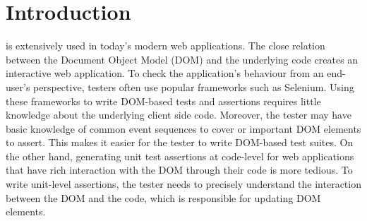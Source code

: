 \section{Introduction} \label{Sec:intro}
\javascript is extensively used in today's modern web applications. The close relation between the Document Object Model (DOM) and the underlying \javascript code creates an interactive web application. To check the application's behaviour from an end-user's perspective, testers often use popular frameworks such as Selenium. Using these frameworks to write DOM-based tests and assertions
requires little knowledge about the underlying client side code. Moreover, the tester may have basic knowledge of common event sequences to cover or important DOM elements to assert. This makes it easier for the tester to write DOM-based test suites. On the other hand,
generating unit test assertions at \javascript code-level for web applications that have rich interaction with the DOM through their \javascript code is more tedious. To write unit-level assertions, the tester needs to precisely understand the interaction between the DOM and the \javascript code, which is responsible for updating DOM elements. 

